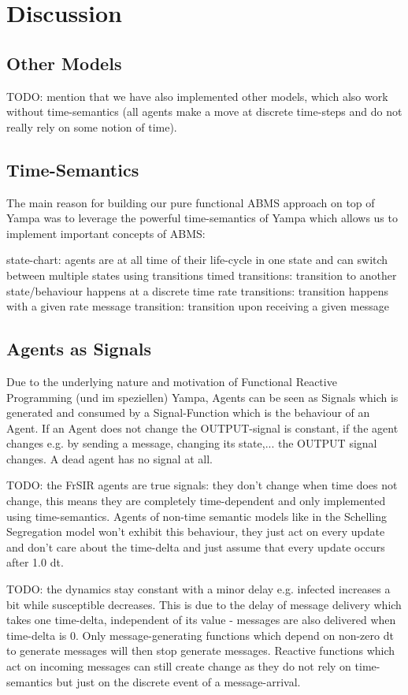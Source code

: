 \section{Discussion}

\subsection{Other Models}
TODO: mention that we have also implemented other models, which also work without time-semantics (all agents make a move at discrete time-steps and do not really rely on some notion of time). 

\subsection{Time-Semantics}
The main reason for building our pure functional ABMS approach on top of Yampa was to leverage the powerful time-semantics of Yampa which allows us to implement important concepts of ABMS:

state-chart: agents are at all time of their life-cycle in one state and can switch between multiple states using transitions 
timed transitions: transition to another state/behaviour happens at a discrete time
rate transitions: transition happens with a given rate
message transition: transition upon receiving a given message 

\subsection{Agents as Signals}
Due to the underlying nature and motivation of Functional Reactive Programming (und im speziellen) Yampa, Agents can be seen as Signals which is generated and consumed by a Signal-Function which is the behaviour of an Agent. If an Agent does not change the OUTPUT-signal is constant, if the agent changes e.g. by sending a message, changing its state,... the OUTPUT signal changes. A dead agent has no signal at all.

TODO: the FrSIR agents are true signals: they don't change when time does not change, this means they are completely time-dependent and only implemented using time-semantics. Agents of non-time semantic models like in the Schelling Segregation model won't exhibit this behaviour, they just act on every update and don't care about the time-delta and just assume that every update occurs after 1.0 dt.

TODO: the dynamics stay constant with a minor delay e.g. infected increases a bit while susceptible decreases. This is due to the delay of message delivery which takes one time-delta, independent of its value - messages are also delivered when time-delta is 0. Only message-generating functions which depend on non-zero dt to generate messages will then stop generate messages. Reactive functions which act on incoming messages can still create change as they do not rely on time-semantics but just on the discrete event of a message-arrival.


